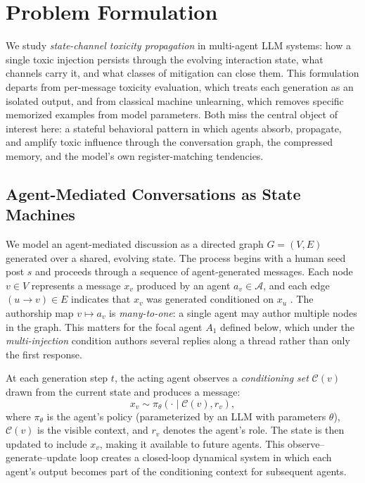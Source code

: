 \section{Problem Formulation}
\label{sec:problem}
We study \emph{state-channel toxicity propagation} in multi-agent LLM systems: how a single toxic injection persists through the evolving interaction state, what channels carry it, and what classes of mitigation can close them.
This formulation departs from per-message toxicity evaluation, which treats each generation as an isolated output, and from classical machine unlearning, which removes specific memorized examples from model parameters.
Both miss the central object of interest here: a stateful behavioral pattern in which agents absorb, propagate, and amplify toxic influence through the conversation graph, the compressed memory, and the model's own register-matching tendencies.

\subsection{Agent-Mediated Conversations as State Machines}
\label{subsec:setup_notation}
We model an agent-mediated discussion as a directed graph $G = (V, E)$ generated over a shared, evolving state.
The process begins with a human seed post $s$ and proceeds through a sequence of agent-generated messages.
Each node $v \in V$ represents a message $x_v$ produced by an agent $a_v \in \mathcal{A}$, and each edge $(u \to v) \in E$ indicates that $x_v$ was generated conditioned on $x_u$ .
The authorship map $v \mapsto a_v$ is \emph{many-to-one}: a single agent may author multiple nodes in the graph.
This matters for the focal agent $A_1$ defined below, which under the \emph{multi-injection} condition authors several replies along a thread rather than only the first response.

At each generation step $t$, the acting agent observes a \emph{conditioning set} $\mathcal{C}(v)$ drawn from the current state and produces a message:
\begin{equation}
    x_v \sim \pi_\theta(\cdot \mid \mathcal{C}(v), r_v),
\end{equation}
where $\pi_\theta$ is the agent's policy (parameterized by an LLM with parameters $\theta$), $\mathcal{C}(v)$ is the visible context, and $r_v$ denotes the agent's role.
The state is then updated to include $x_v$, making it available to future agents. This observe--generate--update loop creates a closed-loop dynamical system in which each agent's output becomes part of the conditioning context for subsequent agents.

